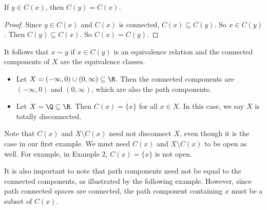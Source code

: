 \documentclass[a4paper]{article}
\begin{document}
\begin{lemma}
  If $y\in C(x)$, then $C(y) = C(x)$.
\end{lemma}

\begin{proof}
  Since $y\in C(x)$ and $C(x)$ is connected, $C(x) \subseteq C(y)$. So $x\in C(y)$. Then $C(y)\subseteq C(x)$. So $C(x) = C(y)$.
\end{proof}

It follows that $x\sim y$ if $x \in C(y)$ is an equivalence relation and the connected components of $X$ are the equivalence classes.

\begin{eg}\leavevmode
  \begin{itemize}
    \item Let $X = (-\infty, 0) \cup (0, \infty)\subseteq \R$. Then the connected components are $(-\infty, 0)$ and $(0, \infty)$, which are also the path components.
    \item Let $X = \Q\subseteq \R$. Then $C(x) = \{x\}$ for all $x\in X$. In this case, we say $X$ is totally disconnected.
  \end{itemize}
\end{eg}
Note that $C(x)$ and $X\setminus C(x)$ need not disconnect $X$, even though it is the case in our first example. We must need $C(x)$ and $X\setminus C(x)$ to be open as well. For example, in Example 2, $C(x) = \{x\}$ is not open.

It is also important to note that path components need not be equal to the connected components, as illustrated by the following example. However, since path connected spaces are connected, the path component containing $x$ must be a subset of $C(x)$.
\end{document}
